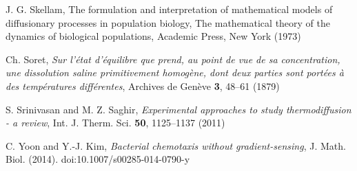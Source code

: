 \documentclass[11pt]{amsart}
\begin{document}
\begin{thebibliography}{10}
J. G. Skellam, The formulation and interpretation of mathematical models of
  diffusionary processes in population biology, The mathematical theory of the
  dynamics of biological populations, Academic Press, New York (1973)

Ch. Soret, \emph{Sur l'\'{e}tat d'\'{e}quilibre que prend, au point de vue de sa
concentration, une dissolution saline primitivement homog\`{e}ne, dont deux parties sont port\'{e}es \`{a} des temp\'{e}ratures diff\'{e}rentes}, Archives de Gen\`{e}ve \textbf{3}, 48--61 (1879)

S. Srinivasan and M. Z. Saghir, \emph{Experimental approaches to study
  thermodiffusion - a review}, Int. J. Therm. Sci. \textbf{50}, 1125--1137 (2011)

C. Yoon and Y.-J. Kim, \emph{Bacterial chemotaxis without gradient-sensing}, J. Math. Biol. (2014). doi:10.1007/s00285-014-0790-y
\end{thebibliography}
\end{document}
